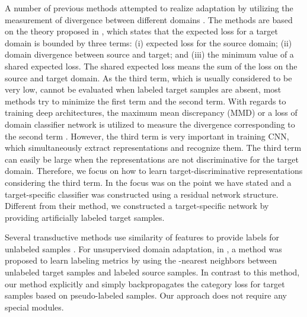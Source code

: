 \documentclass{article}
\begin{document}
A number of previous methods attempted to realize adaptation by utilizing the measurement of divergence between different domains \cite{ganin2014unsupervised,long2015learning,li2016revisiting}.
The methods are based on the theory proposed in \cite{ben2010theory}, which states that the expected loss for a target domain is bounded by three terms: (i) expected loss for the source domain; (ii) domain divergence between source and target; and (iii) the minimum value of a shared expected loss. The shared expected loss means the sum of the loss on the source and target domain. 
As the third term, which is usually considered to be very low, cannot be evaluated when labeled target samples are absent, most methods try to minimize the first term and the second term. With regards to training deep architectures, the maximum mean discrepancy (MMD) or a loss of domain classifier network is utilized to measure the divergence corresponding to the second term \cite{gretton2012kernel,ganin2014unsupervised,long2015learning,long2016unsupervised,bousmalis2016domain}.
However, the third term is very important in training CNN, which simultaneously extract representations and recognize them. The third term can easily be large when the representations are not discriminative for the target domain. Therefore, we focus on how to learn target-discriminative representations considering the third term. In
\cite{long2016unsupervised} the focus was on the point we have stated and a target-specific classifier was constructed using a residual network structure. Different from their method, we constructed a target-specific network by providing artificially labeled target samples.

Several transductive methods use similarity of features to provide labels for unlabeled samples \cite{rohrbach2013transfer,khamis2014coconut}. For unsupervised domain adaptation, in \cite{sener2016learning}, a method was proposed to learn labeling metrics by using the -nearest neighbors between unlabeled target samples and labeled source samples. In contrast to this method, our method explicitly and simply backpropagates the category loss for target samples based on pseudo-labeled samples. Our approach does not require any special modules.
\end{document}
